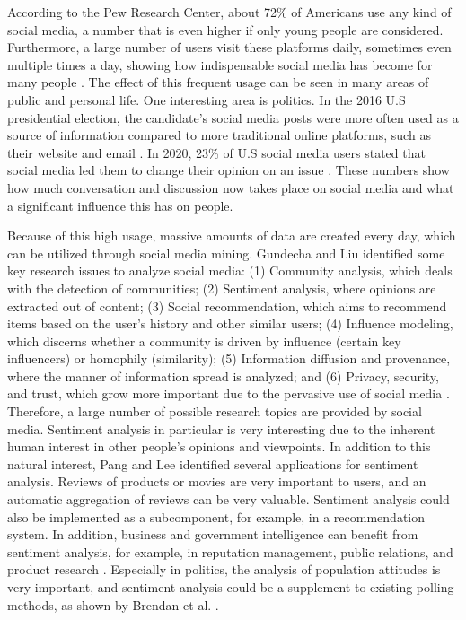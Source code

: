 According to the Pew Research Center, about 72\% of Americans use any kind of social media, a number that is even higher if only young people are considered. Furthermore, a large number of users visit these platforms daily, sometimes even multiple times a day, showing how indispensable social media has become for many people \cite{pew:socialmedia}. The effect of this frequent usage can be seen in many areas of public and personal life. One interesting area is politics. In the 2016 U.S presidential election, the candidate's social media posts were more often used as a source of information compared to more traditional online platforms, such as their website and email \cite{pew:2016source}. In 2020, 23\% of U.S social media users stated that social media led them to change their opinion on an issue \cite{pew:2020influence}. These numbers show how much conversation and discussion now takes place on social media and what a significant influence this has on people.

Because of this high usage, massive amounts of data are created every day, which can be utilized through social media mining. Gundecha and Liu identified some key research issues to analyze social media: (1) Community analysis, which deals with the detection of communities; (2) Sentiment analysis, where opinions are extracted out of content; (3) Social recommendation, which aims to recommend items based on the user's history and other similar users; (4) Influence modeling, which discerns whether a community is driven by influence (certain key influencers) or homophily (similarity); (5) Information diffusion and provenance, where the manner of information spread is analyzed; and (6) Privacy, security, and trust, which grow more important due to the pervasive use of social media \cite{Gundecha2012MiningSM}.
Therefore, a large number of possible research topics are provided by social media. Sentiment analysis in particular is very interesting due to the inherent human interest in other people's opinions and viewpoints. In addition to this natural interest, Pang and Lee identified several applications for sentiment analysis. Reviews of products or movies are very important to users, and an automatic aggregation of reviews can be very valuable. Sentiment analysis could also be implemented as a subcomponent, for example, in a recommendation system. In addition, business and government intelligence can benefit from sentiment analysis, for example, in reputation management, public relations, and product research \cite{pang-etal-2002-thumbs}. Especially in politics, the analysis of population attitudes is very important, and sentiment analysis could be a supplement to existing polling methods, as shown by Brendan et al. \cite{polls}. 

